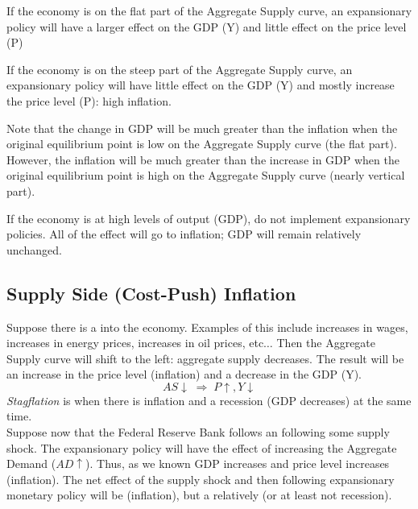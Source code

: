 \documentclass{article}
\begin{document}
\begin{remark}
  If the economy is on the flat part of the Aggregate Supply curve, an expansionary policy will have a larger effect on the GDP (Y) and little effect on the price level (P)
\end{remark}

\begin{remark}
  If the economy is on the steep part of the Aggregate Supply curve, an expansionary policy will have little effect on the GDP (Y) and mostly increase the price level (P): high inflation. 
\end{remark}

Note that the change in GDP will be much greater than the inflation when the original equilibrium point is low on the Aggregate Supply curve (the flat part). However, the inflation will be much greater than the increase in GDP when the original equilibrium point is high on the Aggregate Supply curve (nearly vertical part). 

\begin{remark}
  If the economy is at high levels of output (GDP), do not implement expansionary policies. All of the effect will go to inflation; GDP will remain relatively unchanged. 
\end{remark}

\subsection{Supply Side (Cost-Push) Inflation}

Suppose there is a  into the economy. Examples of this include increases in wages, increases in energy prices, increases in oil prices, etc$\dots$ Then the Aggregate Supply curve will shift to the left: aggregate supply decreases. The result will be an increase in the price level (inflation) and a decrease in the GDP (Y). $$AS \downarrow \; \Rightarrow \; P \uparrow, Y \downarrow$$ \emph{Stagflation} is when there is inflation and a recession (GDP decreases) at the same time. \\ 

Suppose now that the Federal Reserve Bank follows an  following some supply shock. The expansionary policy will have the effect of increasing the Aggregate Demand ($AD\uparrow$). Thus, as we known GDP increases and price level increases (inflation). The net effect of the supply shock and then following expansionary monetary policy will be  (inflation), but a relatively  (or at least not recession). \\ 
\end{document}
